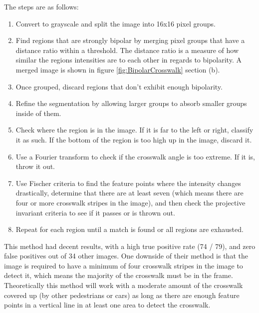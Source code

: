 \documentclass[12pt]{ucthesis}
\begin{document}
The steps are as follows:
\begin{enumerate}
   \item Convert to grayscale and split the image into 16x16 pixel groups.
   \item Find regions that are strongly bipolar by merging pixel groups that have a distance ratio within a threshold. The distance ratio is a measure of how similar the regions intensities are to each other in regards to bipolarity. A merged image is shown in figure \ref{fig:BipolarCrosswalk} section  (b).
   \item Once grouped, discard regions that don't exhibit enough bipolarity.
   \item Refine the segmentation by allowing larger groups to absorb smaller groups inside of them.
   \item Check where the region is in the image. If it is far to the left or right, classify it as such. If the bottom of the region is too high up in the image, discard it.
   \item Use a Fourier transform to check if the crosswalk angle is too extreme. If it is, throw it out. 
   \item Use Fischer criteria to find the feature points where the intensity changes drastically, determine that there are at least seven (which means there are four or more crosswalk stripes in the image), and then check the projective invariant criteria to see if it passes or is thrown out. 
   \item Repeat for each region until a match is found or all regions are exhausted.
\end{enumerate}
This method had decent results, with a high true positive rate (74 / 79), and zero false positives out of 34 other images. One downside of their method is that the image is required to have a minimum of four crosswalk stripes in the image to detect it, which means the majority of the crosswalk must be in the frame. Theoretically this method will work with a moderate amount of the crosswalk covered up (by other pedestrians or cars) as long as there are enough feature points in a vertical line in at least one area to detect the crosswalk. 
\end{document}
